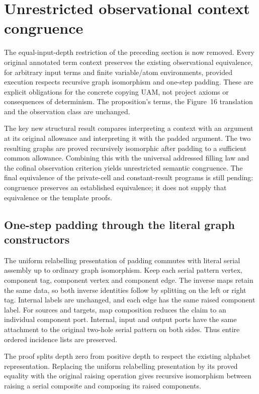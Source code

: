 \clearpage
\section{Unrestricted observational context congruence}
\label{sec:copying-general-congruence}
The equal-input-depth restriction of the preceding section is now removed.
Every original annotated term context preserves the existing observational
equivalence, for arbitrary input terms and finite variable/atom environments,
provided execution respects recursive graph isomorphism and one-step padding.
These are explicit obligations for the concrete copying UAM, not project
axioms or consequences of determinism. The proposition's terms, the Figure~16
translation and the observation class are unchanged.

The key new structural result compares interpreting a context with an argument
at its original allowance and interpreting it with the padded argument. The
two resulting graphs are proved recursively isomorphic after padding to a
sufficient common allowance. Combining this with the universal addressed
filling law and the cofinal observation criterion yields unrestricted semantic
congruence. The final equivalence of the private-cell and constant-result
programs is still pending: congruence preserves an established equivalence;
it does not supply that equivalence or the template proofs.

\subsection{One-step padding through the literal graph constructors}

The uniform relabelling presentation of padding commutes with literal serial
assembly up to ordinary graph isomorphism. Keep each serial pattern vertex,
component tag, component vertex and component edge. The inverse maps retain
the same data, so both inverse identities follow by splitting on the left or
right tag. Internal labels are unchanged, and each edge has the same raised
component label. For sources and targets, map composition reduces the claim
to an individual component port. Internal, input and output ports have the
same attachment to the original two-hole serial pattern on both sides.
Thus entire ordered incidence lists are preserved.

The proof splits depth zero from positive depth to respect the existing
alphabet representation. Replacing the uniform relabelling presentation by
its proved equality with the original raising operation gives recursive
isomorphism between raising a serial composite and composing its raised
components.


